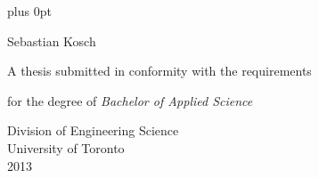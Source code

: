 \fontsize{12pt}{16pt}\selectfont
\thispagestyle{empty}
\pagestyle{fancy}

\baselineskip=16.8pt plus 0pt
\frenchspacing

\begin{centering}
\vspace{3em}
\LARGE{}

\vspace{2em}
\large
\sansfont Sebastian Kosch

\vfill
\normalfont
\fontsize{12pt}{16pt}\selectfont
A thesis submitted in conformity with the requirements

for the degree of \textit{Bachelor of Applied Science}

\vspace{2em}

\textmd Division of Engineering Science\\
University of Toronto\\

2013

\end{centering}
\pagebreak
